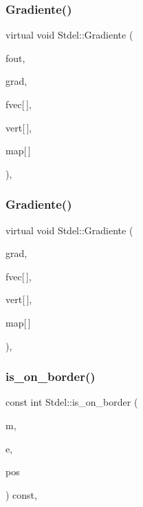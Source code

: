 \subsubsection{\texorpdfstring{Gradiente()}{Gradiente()}\hspace{0.1cm}{\footnotesize\ttfamily [5/6]}}
{\footnotesize\ttfamily virtual void Stdel\+::\+Gradiente (\begin{DoxyParamCaption}\item[{F\+I\+LE $\ast$}]{fout,  }\item[{double $\ast$$\ast$}]{grad,  }\item[{const double}]{fvec\mbox{[}$\,$\mbox{]},  }\item[{const \hyperlink{structVertice}{Vertice}}]{vert\mbox{[}$\,$\mbox{]},  }\item[{const int}]{map\mbox{[}$\,$\mbox{]} }\end{DoxyParamCaption})\hspace{0.3cm}{\ttfamily [pure virtual]}, {\ttfamily [inherited]}}

\mbox{\label{classStdel_aec200dfb0b00bebf70a1d845675eeafd}} 
\subsubsection{\texorpdfstring{Gradiente()}{Gradiente()}\hspace{0.1cm}{\footnotesize\ttfamily [6/6]}}
{\footnotesize\ttfamily virtual void Stdel\+::\+Gradiente (\begin{DoxyParamCaption}\item[{double $\ast$$\ast$}]{grad,  }\item[{const double}]{fvec\mbox{[}$\,$\mbox{]},  }\item[{const \hyperlink{structVertice}{Vertice}}]{vert\mbox{[}$\,$\mbox{]},  }\item[{const int}]{map\mbox{[}$\,$\mbox{]} }\end{DoxyParamCaption})\hspace{0.3cm}{\ttfamily [pure virtual]}, {\ttfamily [inherited]}}

\mbox{\label{classStdel_abb022f0ad81707e11e3a3091d2d87c46}} 
\subsubsection{\texorpdfstring{is\+\_\+on\+\_\+border()}{is\_on\_border()}}
{\footnotesize\ttfamily const int Stdel\+::is\+\_\+on\+\_\+border (\begin{DoxyParamCaption}\item[{int}]{m,  }\item[{int}]{e,  }\item[{int \&}]{pos }\end{DoxyParamCaption}) const\hspace{0.3cm}{\ttfamily [inline]}, {\ttfamily [inherited]}}



